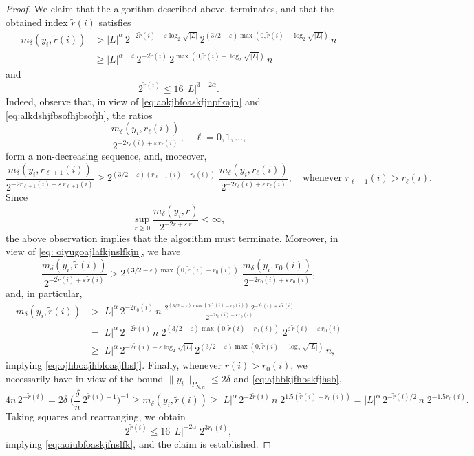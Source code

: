 \documentclass[11pt]{amsart}
\theoremstyle{definition}
\theoremstyle{plain}
\begin{document}
\begin{proof}
We claim that the algorithm described above, terminates,
and that the obtained index $\tilde r(i)$ satisfies
\begin{equation}\label{eq:ojhboajhbfoasjfbslj}
\begin{split}
m_\delta(y_i,\tilde r(i))
&>
|L|^{\alpha}\,2^{-2\tilde r(i)-\varepsilon\log_2\sqrt{|L|}}\,
2^{(3/2-\varepsilon)\max(0,\tilde r(i)-\log_2\sqrt{|L|})}\,n\\
&\geq 
|L|^{\alpha-\varepsilon}\,2^{-2\tilde r(i)}\,
2^{\max(0,\tilde r(i)-\log_2\sqrt{|L|})}\,n    
\end{split}
\end{equation}
and
\begin{equation}\label{eq:aoiubfoaskjfnslfk}
2^{\tilde r(i)}\leq 16\,|L|^{3-2\alpha}.
\end{equation}
Indeed, observe that, in view of 
\eqref{eq:aokjbfoaskfjnpfkajn} and
\eqref{eq:alkdshjfbsofhjbsofjh},
the ratios
$$
\frac{m_\delta(y_i,r_\ell(i))}{2^{-2r_\ell(i)+\varepsilon\,r_\ell(i)}},
\quad \ell=0,1,\dots,
$$
form a non-decreasing sequence,
and, moreover,
\begin{equation}\label{eq: oiyugoajlafkjnslfkjn}
\frac{m_\delta(y_i,r_{\ell+1}(i))}
{2^{-2r_{\ell+1}(i)+\varepsilon\,r_{\ell+1}(i)}}
\geq
2^{(3/2-\varepsilon)(r_{\ell+1}(i)-r_\ell(i))}\;
\frac{m_\delta(y_i,r_\ell(i))}{2^{-2r_\ell(i)+\varepsilon\,r_\ell(i)}},
\quad \mbox{whenever $r_{\ell+1}(i)>r_\ell(i)$}.
\end{equation}
Since
$$
\sup\limits_{r\geq 0}\frac{m_\delta(y_i,r)}
{2^{-2r+\varepsilon\,r}}<\infty,
$$
the above observation implies that the algorithm must terminate.
Moreover, in view of \eqref{eq: oiyugoajlafkjnslfkjn},
we have
$$
\frac{m_\delta(y_i,\tilde r(i))}
{2^{-2\tilde r(i)+\varepsilon\,\tilde r(i)}}
>
2^{(3/2-\varepsilon)\max(0,\tilde r(i)-r_0(i))}\;
\frac{m_\delta(y_i,r_0(i))}{2^{-2r_0(i)+\varepsilon\,r_0(i)}},
$$
and, in particular,
\begin{align}
m_\delta(y_i,\tilde r(i))
&>|L|^{\alpha}\,2^{-2r_0(i)}\,n\;
\frac{2^{(3/2-\varepsilon)\max(0,\tilde r(i)-r_0(i))}\;
2^{-2\tilde r(i)+\varepsilon\,\tilde r(i)}}
{2^{-2r_0(i)+\varepsilon\,r_0(i)}}\nonumber\\
&=
|L|^{\alpha}\,2^{-2\tilde r(i)}\,n\;
2^{(3/2-\varepsilon)\max(0,\tilde r(i)-r_0(i))}\;
2^{\varepsilon\,\tilde r(i)-\varepsilon\,r_0(i)}
\label{eq:ajhbkjfhbskfjhsb}\\
&\geq
|L|^{\alpha}\,2^{-2\tilde r(i)-\varepsilon\log_2\sqrt{|L|}}\,
2^{(3/2-\varepsilon)\max(0,\tilde r(i)-\log_2\sqrt{|L|})}\,n,\nonumber
\end{align}
implying \eqref{eq:ojhboajhbfoasjfbslj}.
Finally, whenever $\tilde r(i)>r_0(i)$,
we necessarily have in view of the bound $\|y_i\|_{P_{N,n}}\leq 2\delta$
and \eqref{eq:ajhbkjfhbskfjhsb},
$$
4n\,2^{-\tilde r(i)}=
2\delta\;\Big(\frac{\delta}{n}\,2^{\tilde r(i)-1}\Big)^{-1}
\geq
m_\delta(y_i,\tilde r(i))
\geq
|L|^{\alpha}\,2^{-2\tilde r(i)}\,n\;
2^{1.5(\tilde r(i)-r_0(i))}
=
|L|^{\alpha}\,2^{-\tilde r(i)/2}\,n\;
2^{-1.5 r_0(i)}.
$$
Taking squares and rearranging, we obtain
$$
2^{\tilde r(i)}\leq
16\,|L|^{-2\alpha}\;
2^{3 r_0(i)},
$$
implying \eqref{eq:aoiubfoaskjfnslfk}, and the claim is established.


\end{proof}
\end{document}
